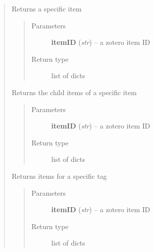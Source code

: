\documentclass[letterpaper,10pt,english]{sphinxmanual}
\begin{document}
\begin{quote}

\begin{fulllineitems}
\label{index:pyzotero.zotero.Zotero.item}
Returns a specific item
\begin{quote}\begin{description}
\item[{Parameters}] \leavevmode
\textbf{itemID} (\emph{str}) -- a zotero item ID

\item[{Return type}] \leavevmode
list of dicts

\end{description}\end{quote}

\end{fulllineitems}


\begin{fulllineitems}
\label{index:pyzotero.zotero.Zotero.children}
Returns the child items of a specific item
\begin{quote}\begin{description}
\item[{Parameters}] \leavevmode
\textbf{itemID} (\emph{str}) -- a zotero item ID

\item[{Return type}] \leavevmode
list of dicts

\end{description}\end{quote}

\end{fulllineitems}


\begin{fulllineitems}
\label{index:pyzotero.zotero.Zotero.tag_items}
Returns items for a specific tag
\begin{quote}\begin{description}
\item[{Parameters}] \leavevmode
\textbf{itemID} (\emph{str}) -- a zotero item ID

\item[{Return type}] \leavevmode
list of dicts


\end{description}
\end{quote}
\end{fulllineitems}
\end{quote}
\end{document}

